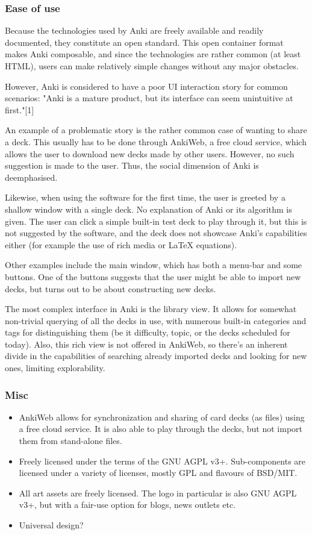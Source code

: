 \subsubsection{Ease of use}

Because the technologies used by Anki are freely available and readily
documented, they constitute an open standard. This open container format makes
Anki composable, and since the technologies are rather common (at least HTML),
users can make relatively simple changes without any major obstacles.

However, Anki is considered to have a poor UI interaction story for common
scenarios: "Anki is a mature product, but its interface can seem unintuitive at
first."[1]

An example of a problematic story is the rather common case of wanting to share
a deck. This usually has to be done through AnkiWeb, a free cloud service, which
allows the user to download new decks made by other users. However, no such
suggestion is made to the user. Thus, the social dimension of Anki is
deemphasised.

Likewise, when using the software for the first time, the user is greeted by a
shallow window with a single deck. No explanation of Anki or its algorithm is
given. The user can click a simple built-in test deck to play through it, but
this is not suggested by the software, and the deck does not showcase Anki's
capabilities either (for example the use of rich media or LaTeX equations).

Other examples include the main window, which has both a menu-bar and some
buttons. One of the buttons suggests that the user might be able to import new
decks, but turns out to be about constructing new decks.

The most complex interface in Anki is the library view. It allows for somewhat
non-trivial querying of all the decks in use, with numerous built-in categories
and tags for distinguishing them (be it difficulty, topic, or the decks
scheduled for today). Also, this rich view is not offered in AnkiWeb, so there's
an inherent divide in the capabilities of searching already imported decks and
looking for new ones, limiting explorability.

\subsubsection{Misc}

\begin{itemize}
\item AnkiWeb allows for synchronization and sharing of card decks (as files) using
  a free cloud service. It is also able to play through the decks, but not
  import them from stand-alone files.
\item Freely licensed under the terms of the GNU AGPL v3+. Sub-components are
  licensed under a variety of licenses, mostly GPL and flavours of BSD/MIT.
\item All art assets are freely licensed. The logo in particular is also GNU AGPL
  v3+, but with a fair-use option for blogs, news outlets etc.
\item Universal design?
\end{itemize}

